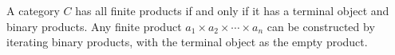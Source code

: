 A category $C$ has all finite products if and only if it has a terminal object and binary products. Any finite product $a_1 \times a_2 \times \cdots \times a_n$ can be constructed by iterating binary products, with the terminal object as the empty product.
